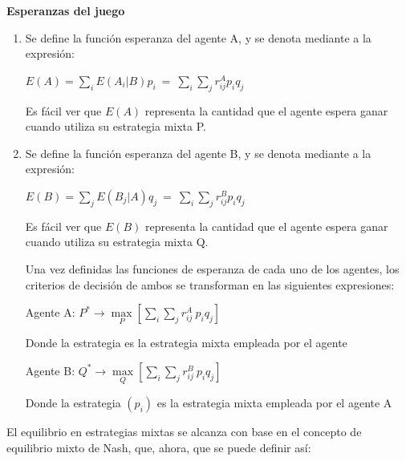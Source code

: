 \begin{definicion}
\textbf{Esperanzas del juego}
\begin{enumerate}
    \item Se define la función esperanza del agente A, y se denota mediante  a la expresión:
     \begin{center}
         $ E(A)=\underset{i}{\sum}E(A_i|B)p_i \: = \: \underset{i}{\sum}\underset{j}{\sum}r_{ij}^Ap_iq_j$\\
     \end{center}
    Es fácil ver que $E(A)$ representa la cantidad que el agente  espera ganar cuando utiliza su estrategia mixta P.
    \item Se define la función esperanza del agente B, y se denota mediante  a la expresión:
    \begin{center}
        $ E(B)=\underset{j}{\sum}E(B_j|A)q_j \: = \: \underset{i}{\sum}\underset{j}{\sum}r_{ij}^Bp_iq_j$\\
     \end{center}
    Es fácil ver que $E(B)$ representa la cantidad que el agente  espera ganar cuando utiliza su estrategia mixta Q.

    Una vez definidas las funciones de esperanza de cada uno de los agentes, los criterios de decisión de ambos se transforman en las siguientes expresiones:
    
     \begin{center}
        Agente A: $P^* \rightarrow \underset{P}{\max}\left[\underset{i}{\sum} \underset{j}{\sum}r_{ij}^A\:p_iq_j\right] $\\
     \end{center}
    
    Donde la estrategia  es la estrategia mixta empleada por el agente 
    
     \begin{center}
        Agente B: $Q^* \rightarrow \underset{Q}{\max}\left[\underset{i}{\sum} \underset{j}{\sum}r_{ij}^B\:p_iq_j\right] $\\
     \end{center}
    
    Donde la estrategia $(p_i)$ es la estrategia mixta empleada por el agente A
\end{enumerate}
\end{definicion}
El equilibrio en estrategias mixtas se alcanza con base en el concepto de equilibrio mixto de Nash, que, ahora, que se puede definir así:\\

